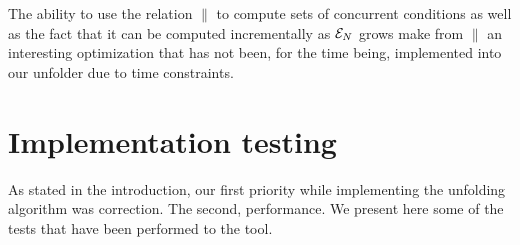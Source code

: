 \documentclass[11pt,a4paper]{article}
\newcommand{\peupdate}{\mbox{\sf pe\_update}}
\begin{document}
The ability to use the relation $\parallel$ to compute sets of concurrent
conditions as well as the fact that it can be computed incrementally as $\mathcal{E}_{N}$ grows make from $\parallel$ an interesting optimization that has not been,
for the time being, implemented into our unfolder due to time constraints.


\section{Implementation testing}
\label{sec:implementation}

As stated in the introduction, our first priority while implementing the
unfolding algorithm was correction.  The second, performance.  We present here
some of the tests that have been performed to the tool.
\end{document}
